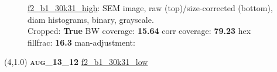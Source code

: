 \begin{figure}[h!]
\label{semimg23}
\caption*{\hyperlink{covtableaug_13_12}{\color{blue} \small \ttfamily f2\_b1\_30k31\_high}: SEM image, raw (top)/size-corrected (bottom), diam histograms, binary, grayscale.\\Cropped: {\bf True} \;\; BW coverage: {\bf 15.64} \:\: corr coverage: {\bf 79.23} \:\: hex fillfrac: {\bf 16.3} \:\: man-adjustment: {\bf \color{blue}{Yes}}}
\end{figure}
\newpage

\begin{textblock}{5}(4,1.0)
{\bf \textsc{aug\_13\_12}}
\hspace{4.5cm}
\hyperlink{covtableaug_13_12}{\color{blue} \large \ttfamily f2\_b1\_30k31\_low}
\end{textblock}

